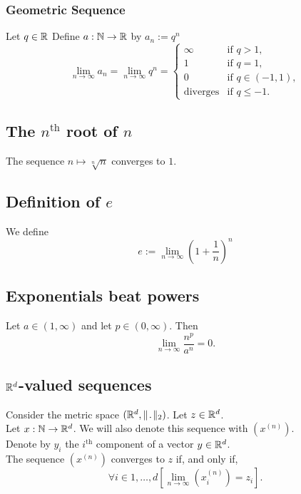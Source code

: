 \subsubsection*{Geometric Sequence}
\uprop Let $q \in \mathbb{R}$ Define $a : \mathbb{N} \to \mathbb{R}$ by $a_n := q^n$
\[
    \lim_{n \to \infty} a_n = \lim_{n \to \infty} q^n =
    \begin{cases}
        \infty & \text{if } q > 1,\\
        1 & \text{if } q = 1,\\
        0 & \text{if } q \in (-1, 1),\\
        \text{diverges} & \text{if } q \leq -1.
    \end{cases}
\]

\subsection*{The $n^{\text{th}}$ root of $n$}
\uprop The sequence $n \mapsto \sqrt[n]{n}$ converges to $1$.

\subsection*{Definition of $e$}
\udef We define
\[
    e := \lim_{n \to \infty} \left( 1 + \frac{1}{n} \right)^n
\]

\subsection*{Exponentials beat powers}
\uprop Let $a \in (1, \infty)$ and let $p \in (0, \infty)$. Then
\[
    \lim_{n \to \infty} \frac{n^p}{a^n} = 0.
\]


\subsection{$\mathbb{R}^d$-valued sequences}
\uprop Consider the metric space $(\R^d, \norm_2)$. Let $z \in \mathbb{R}^d$.\\
Let $x : \mathbb{N} \to \mathbb{R}^d$. We will also denote this sequence with $(x^{(n)})$.\\
Denote by $y_i$ the $i^{\text{th}}$ component of a vector $y \in \mathbb{R}^d$.\\
The sequence $(x^{(n)})$ converges to $z$ if, and only if,
\[
    \forall i \in {1, \dots, d} \left[ \lim_{n \to \infty} (x_i^{(n)}) = z_i \right].
\]